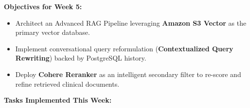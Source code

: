\vspace{0.5em}\noindent\textbf{Objectives for Week 5:}

\begin{itemize}
\tightlist
\item
  Architect an Advanced RAG Pipeline leveraging \textbf{Amazon S3
  Vector} as the primary vector database.
\item
  Implement conversational query reformulation (\textbf{Contextualized
  Query Rewriting}) backed by PostgreSQL history.
\item
  Deploy \textbf{Cohere Reranker} as an intelligent secondary filter to
  re-score and refine retrieved clinical documents.
\end{itemize}

\vspace{0.5em}\noindent\textbf{Tasks Implemented This Week:}

